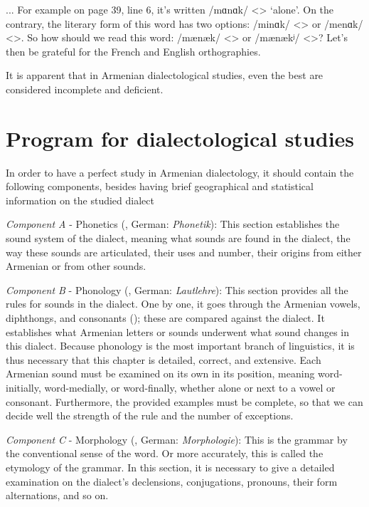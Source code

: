 ... For example on page 39, line 6, it's written /mɑnɑk/ <> `alone'. On the contrary, the literary form of this word has two options: /minɑk/ <> or /menɑk/ <>. So how should we read this word: /mænæk/ <> or /mænækʲ/ <>? Let's then be grateful for the French and English orthographies. 

It is apparent that in Armenian dialectological studies, even the best are considered incomplete and deficient.



\section{Program for dialectological studies}

In order to have a perfect study in Armenian dialectology, it should contain the following components, besides having brief geographical and statistical information on the studied dialect

\textit{Component A} - Phonetics (, German: \textit{Phonetik}): This section establishes the sound system of the dialect, meaning what sounds are found in the dialect, the way these sounds are articulated, their uses and number, their origins from either Armenian or from other sounds.

\textit{Component B} - Phonology (, German: \textit{Lautlehre}): This section provides all the rules for sounds in the dialect. One by one, it goes through the Armenian vowels, diphthongs, and consonants (); these are compared against the dialect. It establishes what Armenian letters or sounds underwent what sound changes in this dialect. Because phonology is the most important branch of linguistics, it is thus necessary that this chapter is detailed, correct, and extensive. Each Armenian sound must be examined on its own in its position, meaning word-initially, word-medially, or word-finally, whether alone or next to a vowel or consonant. Furthermore, the provided examples must be complete, so that we can decide well the strength of the rule and the number of exceptions. 

\textit{Component C} - Morphology (, German: \textit{Morphologie}): This is the grammar by the conventional sense of the word. Or more accurately, this is called the etymology of the grammar. In this section, it is necessary to give a detailed examination on the dialect's declensions, conjugations, pronouns, their form alternations, and so on. 

